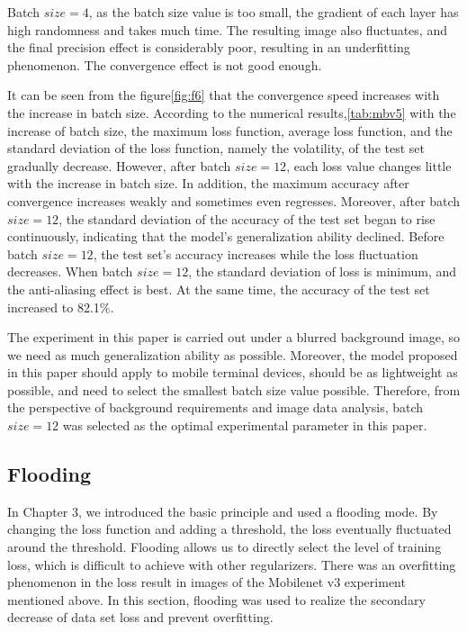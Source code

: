 \documentclass[a4paper,fleqn]{cas-sc}
\begin{document}
Batch $size=4$, as the batch size value is too small, the gradient of each layer has high randomness and takes much time. The resulting image also fluctuates, and the final precision effect is considerably poor, resulting in an underfitting phenomenon. The convergence effect is not good enough. 

It can be seen from the figure\ref{fig:f6} that the convergence speed increases with the increase in batch size. According to the numerical results,\ref{tab:mbv5} with the increase of batch size, the maximum loss function, average loss function, and the standard deviation of the loss function, namely the volatility, of the test set gradually decrease. However, after batch $size=12$, each loss value changes little with the increase in batch size. In addition, the maximum accuracy after convergence increases weakly and sometimes even regresses. Moreover, after batch $size=12$, the standard deviation of the accuracy of the test set began to rise continuously, indicating that the model's generalization ability declined. Before batch $size=12$, the test set's accuracy increases while the loss fluctuation decreases. When batch $size=12$, the standard deviation of loss is minimum, and the anti-aliasing effect is best. At the same time, the accuracy of the test set increased to 82.1\%. 

The experiment in this paper is carried out under a blurred background image, so we need as much generalization ability as possible. Moreover, the model proposed in this paper should apply to mobile terminal devices, should be as lightweight as possible, and need to select the smallest batch size value possible. Therefore, from the perspective of background requirements and image data analysis, batch $size=12$ was selected as the optimal experimental parameter in this paper.

\subsection{Flooding}
In Chapter 3, we introduced the basic principle and used a flooding mode. By changing the loss function and adding a threshold, the loss eventually fluctuated around the threshold. Flooding allows us to directly select the level of training loss, which is difficult to achieve with other regularizers. There was an overfitting phenomenon in the loss result in images of the Mobilenet v3 experiment mentioned above. In this section, flooding was used to realize the secondary decrease of data set loss and prevent overfitting. 
\end{document}
